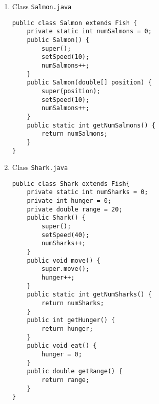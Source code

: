 \begin{enumerate}
\begin{lstlisting}
	// attributes
	private double posRho;
	private double posAng;
	private double speed;
	// methods
	public void move() {
		double oldX = posRho * Math.cos(posAng);
		double oldY = posRho * Math.sin(posAng);
		while (true) {
			double theta = Math.random() * 2 * Math.PI;
			double newX = oldX + speed*Math.cos(theta);
			double newY = oldY + speed*Math.sin(theta);
			double newRho = Math.sqrt(Math.pow(newX,2) + Math.pow(newY,2));
			if (newRho < Pond.getRadius()) {
				posRho = newRho;
				posAng = Math.atan2(newY, newX);
				break;
			}
		}
	}
	// constructor
	public Fish() {
		posRho = Math.random() * Pond.getRadius();
		posAng = Math.random() * 2 * Math.PI;
		numFish++;
	}
	public Fish(double[] position) {
		posRho = Math.sqrt(Math.pow(position[0], 2) + Math.pow(position[1], 2));
		posAng = Math.atan2(position[1], position[0]);
		numFish++;
	}
	// getter and setter for position
	public void setSpeed(double speed) {
		this.speed = speed;
	}
	public static int getNumFish() {
		return numFish;
	}
	public double[] getPosition() {
		double[] position = new double[2];
		position[0] = posRho * Math.cos(posAng);
		position[1] = posRho * Math.sin(posAng);
		return position;
	}
}
\end{lstlisting}
\item Class \texttt{Salmon.java}
\lstset{language=java, tabsize=2}
\begin{lstlisting}
public class Salmon extends Fish {
	private static int numSalmons = 0;
	public Salmon() {
		super();
		setSpeed(10);
		numSalmons++;
	}
	public Salmon(double[] position) {
		super(position);
		setSpeed(10);
		numSalmons++;
	}
	public static int getNumSalmons() {
		return numSalmons;
	}
}
\end{lstlisting}
\item Class \texttt{Shark.java}
\lstset{language=java, tabsize=2}
\begin{lstlisting}
public class Shark extends Fish{
	private static int numSharks = 0;
	private int hunger = 0;
	private double range = 20;
	public Shark() {
		super();
		setSpeed(40);
		numSharks++;
	}
	public void move() {
		super.move();
		hunger++;
	}
	public static int getNumSharks() {
		return numSharks;
	}
	public int getHunger() {
		return hunger;
	}
	public void eat() {
		hunger = 0;
	}
	public double getRange() {
		return range;
	}
}
\end{lstlisting}
\end{enumerate}
